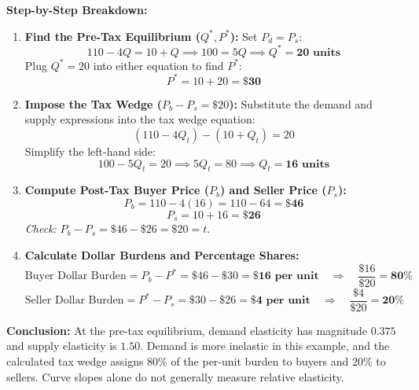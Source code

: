 \documentclass[11pt,letterpaper]{article}
\begin{document}
\noindent\textbf{Step-by-Step Breakdown:}
\begin{enumerate}
    \item \textbf{Find the Pre-Tax Equilibrium ($Q^*, P^*$):}
    Set $P_d = P_s$:
    \[
    110 - 4Q = 10 + Q \implies 100 = 5Q \implies Q^* = \mathbf{20\text{ units}}
    \]
    Plug $Q^* = 20$ into either equation to find $P^*$:
    \[
    P^* = 10 + 20 = \mathbf{\$30}
    \]

    \item \textbf{Impose the Tax Wedge ($P_b - P_s = \$20$):}
    Substitute the demand and supply expressions into the tax wedge equation:
    \[
    (110 - 4Q_t) - (10 + Q_t) = 20
    \]
    Simplify the left-hand side:
    \[
    100 - 5Q_t = 20 \implies 5Q_t = 80 \implies Q_t = \mathbf{16\text{ units}}
    \]

    \item \textbf{Compute Post-Tax Buyer Price ($P_b$) and Seller Price ($P_s$):}
    \[
    P_b = 110 - 4(16) = 110 - 64 = \mathbf{\$46}
    \]
    \[
    P_s = 10 + 16 = \mathbf{\$26}
    \]
    \emph{Check:} $P_b - P_s = \$46 - \$26 = \$20 = t$.

    \item \textbf{Calculate Dollar Burdens and Percentage Shares:}
    \[
    \text{Buyer Dollar Burden} = P_b - P^* = \$46 - \$30 = \mathbf{\$16\text{ per unit}} \quad \Longrightarrow \quad \frac{\$16}{\$20} = \mathbf{80\%}
    \]
    \[
    \text{Seller Dollar Burden} = P^* - P_s = \$30 - \$26 = \mathbf{\$4\text{ per unit}} \quad \Longrightarrow \quad \frac{\$4}{\$20} = \mathbf{20\%}
    \]
\end{enumerate}
\textbf{Conclusion:} At the pre-tax equilibrium, demand elasticity has magnitude $0.375$ and supply elasticity is $1.50$. Demand is more inelastic in this example, and the calculated tax wedge assigns \textbf{$80\%$} of the per-unit burden to buyers and \textbf{$20\%$} to sellers. Curve slopes alone do not generally measure relative elasticity.
\end{document}
